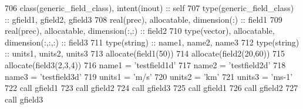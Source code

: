 \begin{DoxyCode}
706     \textcolor{keywordtype}{class}(generic\_field\_class), \textcolor{keywordtype}{intent(inout)} :: self
707     \textcolor{keywordtype}{type}(generic\_field\_class) :: gfield1, gfield2, gfield3
708     \textcolor{keywordtype}{real(prec)}, \textcolor{keywordtype}{allocatable}, \textcolor{keywordtype}{dimension(:)} :: field1
709     \textcolor{keywordtype}{real(prec)}, \textcolor{keywordtype}{allocatable}, \textcolor{keywordtype}{dimension(:,:)} :: field2
710     \textcolor{keywordtype}{type}(vector), \textcolor{keywordtype}{allocatable}, \textcolor{keywordtype}{dimension(:,:,:)} :: field3
711     \textcolor{keywordtype}{type}(string) :: name1, name2, name3
712     \textcolor{keywordtype}{type}(string) :: units1, units2, units3
713     \textcolor{keyword}{allocate}(field1(50))
714     \textcolor{keyword}{allocate}(field2(20,60))
715     \textcolor{keyword}{allocate}(field3(2,3,4))
716     name1 = \textcolor{stringliteral}{'testfield1d'}
717     name2 = \textcolor{stringliteral}{'testfield2d'}
718     name3 = \textcolor{stringliteral}{'testfield3d'}
719     units1 = \textcolor{stringliteral}{'m/s'}
720     units2 = \textcolor{stringliteral}{'km'}
721     units3 = \textcolor{stringliteral}{'ms-1'}
722     \textcolor{keyword}{call }gfield1%
723     \textcolor{keyword}{call }gfield2%
724     \textcolor{keyword}{call }gfield3%
725     \textcolor{keyword}{call }gfield1%
726     \textcolor{keyword}{call }gfield2%
727     \textcolor{keyword}{call }gfield3%
\end{DoxyCode}
